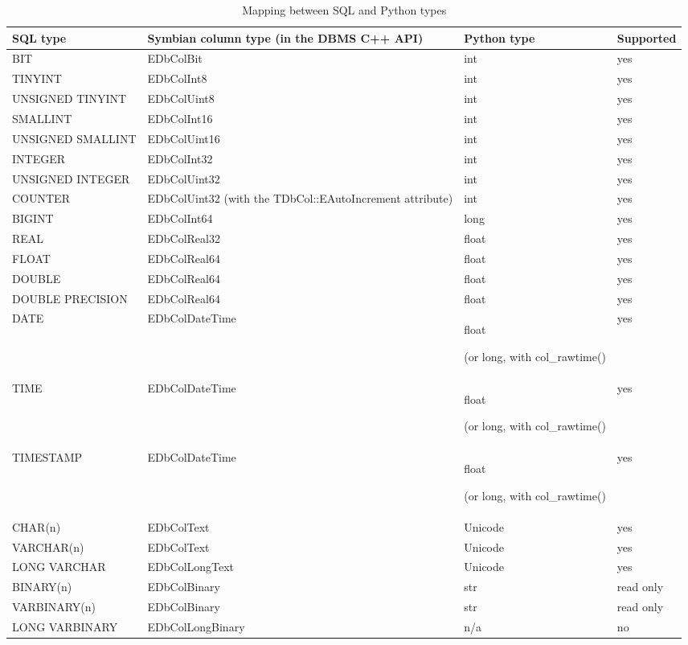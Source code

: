 \begin{table}[htbp]
\begin{center}
\begin{tabular}{|p{117pt}|p{144pt}|p{99pt}|p{63pt}|}
\hline
SQL type& 
Symbian column type (in the DBMS C++ API)& 
Python type& 
Supported \\
\hline
\textsf{BIT}& 
\textsf{EDbColBit}& 
int & 
yes \\
\hline
\textsf{TINYINT}& 
\textsf{EDbColInt8}& 
int & 
yes \\
\hline
\textsf{UNSIGNED TINYINT}& 
\textsf{EDbColUint8}& 
int & 
yes \\
\hline
\textsf{SMALLINT}& 
\textsf{EDbColInt16}& 
int & 
yes \\
\textsf{UNSIGNED SMALLINT}& 
\textsf{EDbColUint16}& 
int & 
yes \\
\hline
\textsf{INTEGER}& 
\textsf{EDbColInt32}& 
int & 
yes \\
\hline
\textsf{UNSIGNED INTEGER}& 
\textsf{EDbColUint32}& 
int & 
yes \\
\hline
\textsf{COUNTER}& 
\textsf{EDbColUint32 (}with the\textsf{ TDbCol::EAutoIncrement }attribute\textsf{)}& 
int & 
yes \\
\hline
\textsf{BIGINT}& 
\textsf{EDbColInt64}& 
long & 
yes \\
\hline
\textsf{REAL}& 
\textsf{EDbColReal32}& 
float & 
yes \\
\hline
\textsf{FLOAT}& 
\textsf{EDbColReal64}& 
float & 
yes \\
\hline
\textsf{DOUBLE}& 
\textsf{EDbColReal64}& 
float & 
yes \\
\hline
\textsf{DOUBLE PRECISION}& 
\textsf{EDbColReal64}& 
float & 
yes \\
\hline
\textsf{DATE}& 
\textsf{EDbColDateTime}& 
float \par (or long, with \textsf{col_rawtime()} & 
yes \\
\hline
\textsf{TIME}& 
\textsf{EDbColDateTime}& 
float \par (or long, with \textsf{col_rawtime()} & 
yes \\
\hline
\textsf{TIMESTAMP}& 
\textsf{EDbColDateTime}& 
float \par (or long, with \textsf{col_rawtime()} & 
yes \\
\hline
\textsf{CHAR(n)}& 
\textsf{EDbColText}& 
Unicode & 
yes \\
\hline
\textsf{VARCHAR(n)}& 
\textsf{EDbColText}& 
Unicode & 
yes \\
\hline
\textsf{LONG VARCHAR}& 
\textsf{EDbColLongText}& 
Unicode & 
yes \\
\hline
\textsf{BINARY(n)}& 
\textsf{EDbColBinary}& 
str & 
read only \\
\hline
\textsf{VARBINARY(n)}& 
\textsf{EDbColBinary}& 
str & 
read only \\
\hline
\textsf{LONG VARBINARY}& 
\textsf{EDbColLongBinary}& 
n/a& 
no \\
\hline
\end{tabular}
\caption{Mapping between SQL and Python types}
\label{tab:sqltypes}
\end{center}
\end{table}


